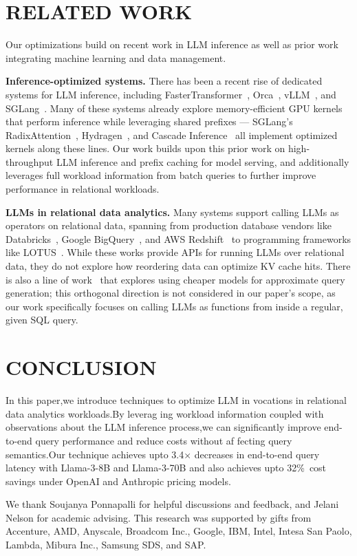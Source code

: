 \documentclass[manuscript,review]{acmart}
\begin{document}
\section{RELATED WORK}
\label{sec:related-work}
Our optimizations build on recent work in LLM inference as well as prior work integrating machine learning and data management.

\textbf{Inference-optimized systems.} There has been a recent rise of dedicated systems for LLM inference, including FasterTransformer~\cite{nvidia2023fastertransformer}, Orca~\cite{yu2022orca}, vLLM~\cite{kwon2023vllm}, and SGLang~\cite{zheng2023sglang}. Many of these systems already explore memory-efficient GPU kernels that perform inference while leveraging shared prefixes — SGLang's RadixAttention~\cite{zheng2023sglang}, Hydragen~\cite{juravsky2024hydragen}, and Cascade Inference~\cite{ye2024cascade} all implement optimized kernels along these lines. Our work builds upon this prior work on high-throughput LLM inference and prefix caching for model serving, and additionally leverages full workload information from batch queries to further improve performance in relational workloads.

\textbf{LLMs in relational data analytics.} Many systems support calling LLMs as operators on relational data, spanning from production database vendors like Databricks~\cite{databricks_ai_functions}, Google BigQuery~\cite{bigquery_llm}, and AWS Redshift~\cite{aws_redshift_llm} to programming frameworks like LOTUS~\cite{patel2024lotus}. While these works provide APIs for running LLMs over relational data, they do not explore how reordering data can optimize KV cache hits. There is also a line of work~\cite{kang2017noscope,lu2018probabilistic} that explores using cheaper models for approximate query generation; this orthogonal direction is not considered in our paper's scope, as our work specifically focuses on calling LLMs as functions from inside a regular, given SQL query.
\section{CONCLUSION}
In this paper,we introduce techniques to optimize LLM in 
vocations in relational data analytics workloads.By leverag
ing workload information coupled with observations about 
the LLM inference process,we can significantly improve 
end-to-end query performance and reduce costs without af
fecting query semantics.Our technique achieves upto 3.4× 
decreases in end-to-end query latency with Llama-3-8B and 
Llama-3-70B and also achieves upto 32\%\ cost savings 
under OpenAI and Anthropic pricing models.
\begin{acks}
We thank Soujanya Ponnapalli for helpful discussions and feedback, 
and Jelani Nelson for academic advising. This research was supported 
by gifts from Accenture, AMD, Anyscale, Broadcom Inc., Google, IBM, 
Intel, Intesa San Paolo, Lambda, Mibura Inc., Samsung SDS, and SAP.
\end{acks}


\end{document}
